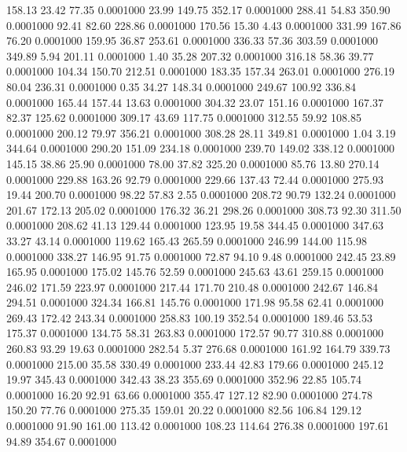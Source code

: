  158.13   23.42   77.35   0.0001000
  23.99  149.75  352.17   0.0001000
 288.41   54.83  350.90   0.0001000
  92.41   82.60  228.86   0.0001000
 170.56   15.30    4.43   0.0001000
 331.99  167.86   76.20   0.0001000
 159.95   36.87  253.61   0.0001000
 336.33   57.36  303.59   0.0001000
 349.89    5.94  201.11   0.0001000
   1.40   35.28  207.32   0.0001000
 316.18   58.36   39.77   0.0001000
 104.34  150.70  212.51   0.0001000
 183.35  157.34  263.01   0.0001000
 276.19   80.04  236.31   0.0001000
   0.35   34.27  148.34   0.0001000
 249.67  100.92  336.84   0.0001000
 165.44  157.44   13.63   0.0001000
 304.32   23.07  151.16   0.0001000
 167.37   82.37  125.62   0.0001000
 309.17   43.69  117.75   0.0001000
 312.55   59.92  108.85   0.0001000
 200.12   79.97  356.21   0.0001000
 308.28   28.11  349.81   0.0001000
   1.04    3.19  344.64   0.0001000
 290.20  151.09  234.18   0.0001000
 239.70  149.02  338.12   0.0001000
 145.15   38.86   25.90   0.0001000
  78.00   37.82  325.20   0.0001000
  85.76   13.80  270.14   0.0001000
 229.88  163.26   92.79   0.0001000
 229.66  137.43   72.44   0.0001000
 275.93   19.44  200.70   0.0001000
  98.22   57.83    2.55   0.0001000
 208.72   90.79  132.24   0.0001000
 201.67  172.13  205.02   0.0001000
 176.32   36.21  298.26   0.0001000
 308.73   92.30  311.50   0.0001000
 208.62   41.13  129.44   0.0001000
 123.95   19.58  344.45   0.0001000
 347.63   33.27   43.14   0.0001000
 119.62  165.43  265.59   0.0001000
 246.99  144.00  115.98   0.0001000
 338.27  146.95   91.75   0.0001000
  72.87   94.10    9.48   0.0001000
 242.45   23.89  165.95   0.0001000
 175.02  145.76   52.59   0.0001000
 245.63   43.61  259.15   0.0001000
 246.02  171.59  223.97   0.0001000
 217.44  171.70  210.48   0.0001000
 242.67  146.84  294.51   0.0001000
 324.34  166.81  145.76   0.0001000
 171.98   95.58   62.41   0.0001000
 269.43  172.42  243.34   0.0001000
 258.83  100.19  352.54   0.0001000
 189.46   53.53  175.37   0.0001000
 134.75   58.31  263.83   0.0001000
 172.57   90.77  310.88   0.0001000
 260.83   93.29   19.63   0.0001000
 282.54    5.37  276.68   0.0001000
 161.92  164.79  339.73   0.0001000
 215.00   35.58  330.49   0.0001000
 233.44   42.83  179.66   0.0001000
 245.12   19.97  345.43   0.0001000
 342.43   38.23  355.69   0.0001000
 352.96   22.85  105.74   0.0001000
  16.20   92.91   63.66   0.0001000
 355.47  127.12   82.90   0.0001000
 274.78  150.20   77.76   0.0001000
 275.35  159.01   20.22   0.0001000
  82.56  106.84  129.12   0.0001000
  91.90  161.00  113.42   0.0001000
 108.23  114.64  276.38   0.0001000
 197.61   94.89  354.67   0.0001000

